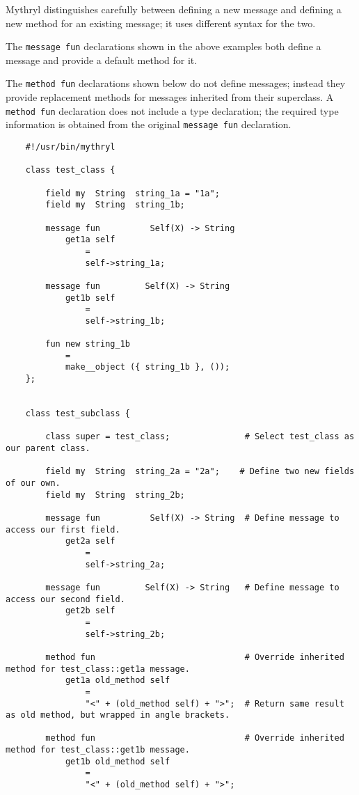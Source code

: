 Mythryl distinguishes carefully between defining a new message and defining 
a new method for an existing message;  it uses different syntax for the two.

The {\tt message fun} declarations shown in the above examples both define a 
message and provide a default method for it.

The {\tt method fun} declarations shown below do not define messages;  instead 
they provide replacement methods for messages inherited from their superclass. 
A {\tt method fun} declaration does not include a type declaration;  the required 
type information is obtained from the original {\tt message fun} declaration.

\begin{verbatim}
    #!/usr/bin/mythryl

    class test_class {

        field my  String  string_1a = "1a";
        field my  String  string_1b;

        message fun          Self(X) -> String
            get1a self
                =
                self->string_1a;

        message fun         Self(X) -> String
            get1b self
                =
                self->string_1b;

        fun new string_1b
            =
            make__object ({ string_1b }, ());
    };


    class test_subclass {

        class super = test_class;               # Select test_class as our parent class.

        field my  String  string_2a = "2a";    # Define two new fields of our own.
        field my  String  string_2b;

        message fun          Self(X) -> String  # Define message to access our first field.
            get2a self
                =
                self->string_2a;

        message fun         Self(X) -> String   # Define message to access our second field.
            get2b self
                =
                self->string_2b;

        method fun                              # Override inherited method for test_class::get1a message.
            get1a old_method self
                =
                "<" + (old_method self) + ">";  # Return same result as old method, but wrapped in angle brackets.

        method fun                              # Override inherited method for test_class::get1b message.
            get1b old_method self
                =
                "<" + (old_method self) + ">";



\end{verbatim}

